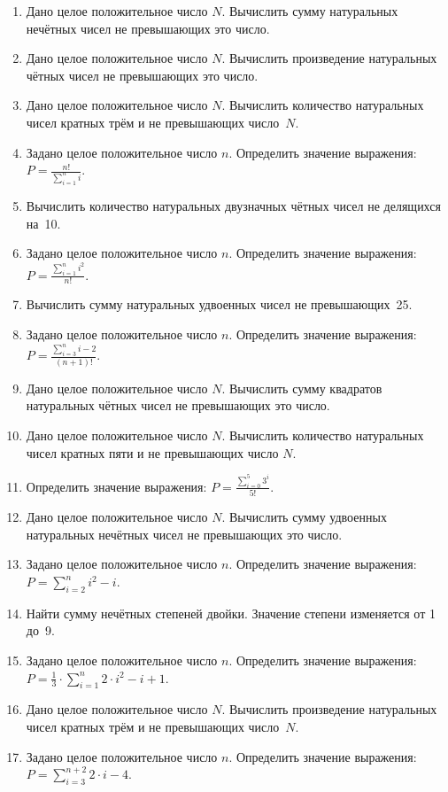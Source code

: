 \begin{enumerate}
\item Дано целое положительное число $N$. Вычислить сумму натуральных нечётных чисел не превышающих
это число.
\item Дано целое положительное число $N$. Вычислить произведение натуральных чётных чисел не
превышающих это число.
\item Дано целое положительное число $N$. Вычислить количество натуральных чисел кратных трём и не
превышающих число~$N$.
\item Задано целое положительное число $n$. Определить значение выражения:
 $\displaystyle P=\frac{n!}{\sum\limits_{i=1}^{n}i}.$
\item Вычислить количество натуральных двузначных чётных чисел не делящихся на~10.
\item Задано целое положительное число $n$. Определить значение выражения:
$\displaystyle P=\frac{\sum\limits_{i=1}^ni^2}{n!}.$
\item Вычислить сумму натуральных удвоенных чисел не превышающих~25.
\item Задано целое положительное число $n$. Определить значение выражения:
$P=\frac{\sum\limits_{i=3}^{n}i-2}{(n+1)!}.$
\item Дано целое положительное число $N$. Вычислить сумму квадратов натуральных чётных чисел не
превышающих это число.
\item Дано целое положительное число $N$. Вычислить количество натуральных чисел кратных пяти и не
превышающих число $N$.
\item Определить значение выражения:
 $P=\frac{\sum\limits_{i=0}^{5}3^{i}}{5!}.$
\item Дано целое положительное число $N$. Вычислить сумму удвоенных натуральных нечётных чисел не
превышающих это число.
\item Задано целое положительное число $n$. Определить значение выражения:
 $P=\sum\limits_{i=2}^{n}i^{2}-i.$
\item Найти сумму нечётных степеней двойки. Значение степени изменяется от 1 до~9.
\item Задано целое положительное число $n$. Определить значение выражения:
 $P=\frac{1}{3}\cdot {\sum\limits_{i=1}^{n}2\cdot i^{2}-i+1}.$
\item Дано целое положительное число $N$. Вычислить произведение натуральных чисел кратных трём и не
превышающих число~$N$.
\item Задано целое положительное число $n$. Определить значение выражения:
 $P=\sum\limits_{i=3}^{n+2}2\cdot i-4.$

\end{enumerate}
